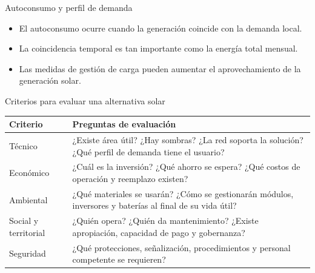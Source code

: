 \documentclass[aspectratio=169,10pt]{beamer}
\begin{document}
\begin{frame}{Autoconsumo y perfil de demanda}
\centering
{}

\vspace{0.3cm}

\begin{itemize}
    \item El autoconsumo ocurre cuando la generación coincide con la demanda local.
    \item La coincidencia temporal es tan importante como la energía total mensual.
    \item Las medidas de gestión de carga pueden aumentar el aprovechamiento de la generación solar.
\end{itemize}
\end{frame}

\begin{frame}{Criterios para evaluar una alternativa solar}
\begin{table}
\centering
\small
\begin{tabular}{p{} p{}}
\toprule
\textbf{Criterio} & \textbf{Preguntas de evaluación} \\
\midrule
Técnico & ¿Existe área útil? ¿Hay sombras? ¿La red soporta la solución? ¿Qué perfil de demanda tiene el usuario? \\
\addlinespace
Económico & ¿Cuál es la inversión? ¿Qué ahorro se espera? ¿Qué costos de operación y reemplazo existen? \\
\addlinespace
Ambiental & ¿Qué materiales se usarán? ¿Cómo se gestionarán módulos, inversores y baterías al final de su vida útil? \\
\addlinespace
Social y territorial & ¿Quién opera? ¿Quién da mantenimiento? ¿Existe apropiación, capacidad de pago y gobernanza? \\
\addlinespace
Seguridad & ¿Qué protecciones, señalización, procedimientos y personal competente se requieren? \\
\bottomrule
\end{tabular}
\end{table}
\end{frame}
\end{document}
